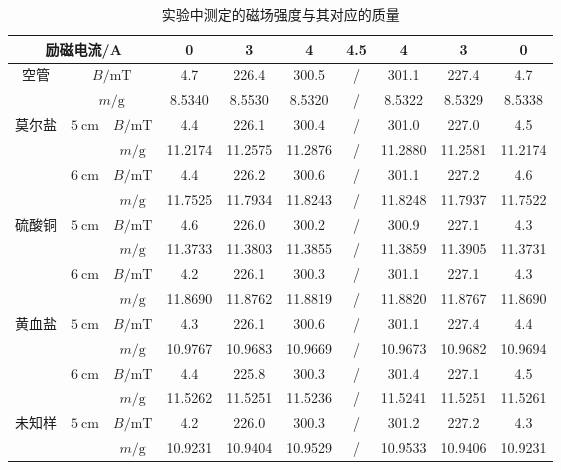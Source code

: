 \documentclass[cn,hazy,pku,12pt,normal,math=newtx,cite=super]{elegantnote}
\begin{document}
\begin{table}[H]
\centering
\caption{实验中测定的磁场强度与其对应的质量}
\begin{tabular}{cccccccccc}
\toprule
\multicolumn{3}{c}{励磁电流/A} & 0 & 3 & 4 & 4.5 & 4 & 3 & 0 \\
\midrule
\multirow{2}{*}{空管} & \multicolumn{2}{c}{$B / \mathrm{mT}$} & 4.7 & 226.4 & 300.5  & / & 301.1 & 227.4 & 4.7  \\
& \multicolumn{2}{c}{$m/ \mathrm{g}$} & 8.5340 & 8.5530 & 8.5320  & / & 8.5322 & 8.5329 & 8.5338 \\
\midrule
\multirow{4}{*}{莫尔盐} & \multirow{2}{*}{$5 \mathrm{~cm}$} & $B / \mathrm{mT}$ & 4.4 & 226.1 & 300.4  & / & 301.0 & 227.0 & 4.5 \\
& & $m/ \mathrm{g}$ & 11.2174 & 11.2575 & 11.2876  & / & 11.2880 & 11.2581 & 11.2174 \\
\cline{2-10}
& \multirow{2}{*}{$6 \mathrm{~cm}$} & $B / \mathrm{mT}$ & 4.4 & 226.2 & 300.6  & / & 301.1 & 227.2 & 4.6 \\
& & $m/ \mathrm{g}$ & 11.7525 & 11.7934 & 11.8243  & / & 11.8248 & 11.7937 & 11.7522 \\
\midrule
\multirow{4}{*}{硫酸铜} & \multirow{2}{*}{$5 \mathrm{~cm}$} & $B / \mathrm{mT}$ & 4.6 & 226.0 & 300.2  & / & 300.9 & 227.1 & 4.3 \\
& & $m/ \mathrm{g}$ & 11.3733 & 11.3803 & 11.3855  & / & 11.3859 & 11.3905 & 11.3731 \\
\cline{2-10}
& \multirow{2}{*}{$6 \mathrm{~cm}$} & $B / \mathrm{mT}$ & 4.2 & 226.1 & 300.3  & / & 301.1 & 227.1 & 4.3 \\
& & $m/ \mathrm{g}$ & 11.8690 & 11.8762 & 11.8819  & / & 11.8820 & 11.8767 & 11.8690 \\
\midrule
\multirow{4}{*}{黄血盐} & \multirow{2}{*}{$5 \mathrm{~cm}$} & $B / \mathrm{mT}$ & 4.3 & 226.1 & 300.6  & / & 301.1 & 227.4 & 4.4 \\
& & $m/ \mathrm{g}$ & 10.9767 & 10.9683 & 10.9669  & / & 10.9673 & 10.9682 & 10.9694 \\
\cline{2-10}
& \multirow{2}{*}{$6 \mathrm{~cm}$} & $B / \mathrm{mT}$ & 4.4 & 225.8 & 300.3  & / & 301.4 & 227.1 & 4.5 \\
& & $m/ \mathrm{g}$ & 11.5262 & 11.5251 & 11.5236  & / & 11.5241 & 11.5251 & 11.5261 \\
\midrule
\multirow{8}{*}{未知样} & \multirow{2}{*}{$5 \mathrm{~cm}$} & $B / \mathrm{mT}$ & 4.2 & 226.0 & 300.3  & / & 301.2 & 227.2 & 4.3 \\
& & $m/ \mathrm{g}$ & 10.9231 & 10.9404 & 10.9529  & / & 10.9533 & 10.9406 & 10.9231 \\

\end{tabular}
\end{table}
\end{document}
